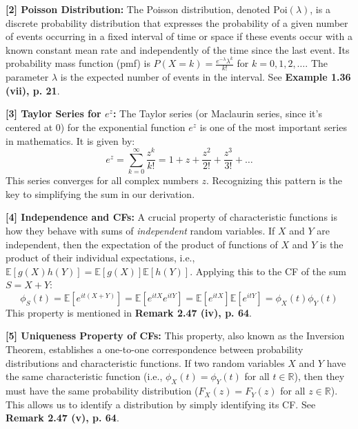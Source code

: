\documentclass[11pt,a4paper]{article}
\begin{document}
\vspace{1em}
\hypertarget{note2}{}{\textbf{[2] Poisson Distribution:}}
The Poisson distribution, denoted $\text{Poi}(\lambda)$, is a discrete probability distribution that expresses the probability of a given number of events occurring in a fixed interval of time or space if these events occur with a known constant mean rate and independently of the time since the last event. Its probability mass function (pmf) is $P(X=k) = \frac{e^{-\lambda}\lambda^k}{k!}$ for $k=0, 1, 2, \dots$. The parameter $\lambda$ is the expected number of events in the interval. See \textbf{Example 1.36 (vii), p. 21}.

\vspace{1em}
\hypertarget{note3}{}{\textbf{[3] Taylor Series for $e^z$:}}
The Taylor series (or Maclaurin series, since it's centered at 0) for the exponential function $e^z$ is one of the most important series in mathematics. It is given by:
\[ e^z = \sum_{k=0}^{\infty} \frac{z^k}{k!} = 1 + z + \frac{z^2}{2!} + \frac{z^3}{3!} + \dots \]
This series converges for all complex numbers $z$. Recognizing this pattern is the key to simplifying the sum in our derivation.

\vspace{1em}
\hypertarget{note4}{}{\textbf{[4] Independence and CFs:}}
A crucial property of characteristic functions is how they behave with sums of \textit{independent} random variables. If $X$ and $Y$ are independent, then the expectation of the product of functions of $X$ and $Y$ is the product of their individual expectations, i.e., $\mathbb{E}[g(X)h(Y)] = \mathbb{E}[g(X)]\mathbb{E}[h(Y)]$. Applying this to the CF of the sum $S=X+Y$:
\[ \phi_S(t) = \mathbb{E}[e^{it(X+Y)}] = \mathbb{E}[e^{itX}e^{itY}] = \mathbb{E}[e^{itX}]\mathbb{E}[e^{itY}] = \phi_X(t)\phi_Y(t) \]
This property is mentioned in \textbf{Remark 2.47 (iv), p. 64}.

\vspace{1em}
\hypertarget{note5}{}{\textbf{[5] Uniqueness Property of CFs:}}
This property, also known as the Inversion Theorem, establishes a one-to-one correspondence between probability distributions and characteristic functions. If two random variables $X$ and $Y$ have the same characteristic function (i.e., $\phi_X(t) = \phi_Y(t)$ for all $t \in \mathbb{R}$), then they must have the same probability distribution ($F_X(z) = F_Y(z)$ for all $z \in \mathbb{R}$). This allows us to identify a distribution by simply identifying its CF. See \textbf{Remark 2.47 (v), p. 64}.
\end{document}
